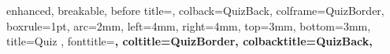 


\renewcommand{\thequiz}{\arabic{quiz}}

 {
    enhanced,
    breakable,
    before title={},
    colback=QuizBack,
    colframe=QuizBorder,
    boxrule=1pt,
    arc=2mm,
    left=4mm,
    right=4mm,
    top=3mm,
    bottom=3mm,
    title={Quiz \thequiz},
    fonttitle=\bfseries\large,
    coltitle=QuizBorder,
    colbacktitle=QuizBack,
}



